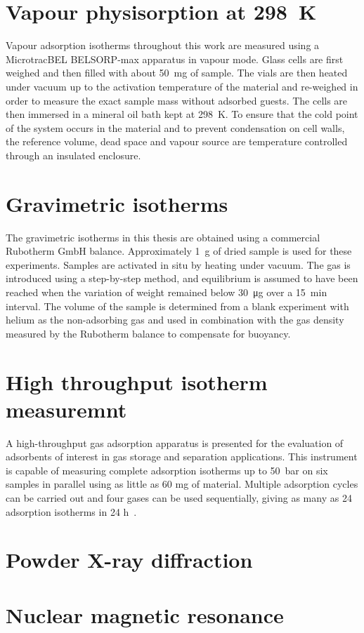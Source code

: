 \section{Vapour physisorption at \SI{298}{\kelvin}}\label{appx:char:vapourphys}

Vapour adsorption isotherms throughout this work are measured
using a MicrotracBEL BELSORP-max apparatus in vapour mode.
Glass cells are first weighed and then filled with about
\SI{50}{\milli\gram} of sample. The vials are then heated
under vacuum up to the activation temperature of the material
and re-weighed in order to measure the exact sample mass
without adsorbed guests. The cells are then immersed in a
mineral oil bath kept at \SI{298}{\kelvin}. To ensure that the 
cold point of the system occurs in the material and to 
prevent condensation on cell walls, the reference volume, dead space 
and vapour source are temperature controlled through an
insulated enclosure.

\section{Gravimetric isotherms}\label{appx:char:gravimetry}

The gravimetric isotherms in this thesis are obtained 
using a commercial Rubotherm GmbH balance. Approximately 
\SI{1}{\gram} of dried sample is used for these experiments. 
Samples are activated in situ by heating under vacuum. 
The gas is introduced using a step-by-step method, and equilibrium is
assumed to have been reached when the variation of weight remained
below \SI{30}{\micro\gram} over a \SI{15}{\minute} interval. 
The volume of the sample is determined from a blank experiment 
with helium as the non-adsorbing
gas and used in combination with the gas density measured by the
Rubotherm balance to compensate for buoyancy.

\section{High throughput isotherm measuremnt}\label{appx:char:highthroughput}

A high-throughput gas adsorption apparatus is presented for the 
evaluation of adsorbents of interest in gas storage and
separation applications. This instrument is capable of measuring 
complete adsorption isotherms up to \SI{50}{\bar} on six samples in 
parallel using as little as 60 mg of material. Multiple adsorption 
cycles can be carried out and four gases can be used sequentially, 
giving as many as 24 adsorption isotherms 
in 24 h~\cite{wiersumExperimentalScreeningPorous2013}.

\section{Powder X-ray diffraction}\label{appx:char:pxrd}

\section{Nuclear magnetic resonance}\label{appx:char:nmr}


